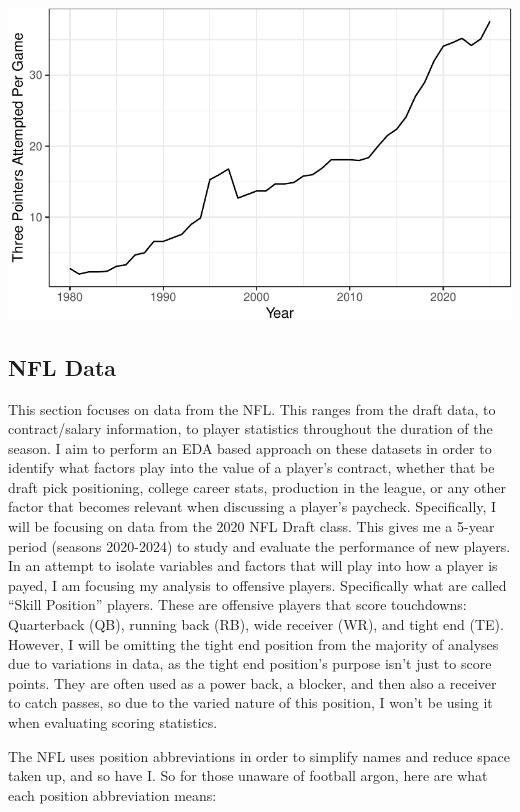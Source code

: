 \documentclass[
  letterpaper,
  DIV=11,
  numbers=noendperiod]{scrartcl}
\begin{document}
\includegraphics{final_qmd_file_files/figure-pdf/unnamed-chunk-1-1.pdf}

\subsection{NFL Data}\label{nfl-data}

This section focuses on data from the NFL. This ranges from the draft
data, to contract/salary information, to player statistics throughout
the duration of the season. I aim to perform an EDA based approach on
these datasets in order to identify what factors play into the value of
a player's contract, whether that be draft pick positioning, college
career stats, production in the league, or any other factor that becomes
relevant when discussing a player's paycheck. Specifically, I will be
focusing on data from the 2020 NFL Draft class. This gives me a 5-year
period (seasons 2020-2024) to study and evaluate the performance of new
players. In an attempt to isolate variables and factors that will play
into how a player is payed, I am focusing my analysis to offensive
players. Specifically what are called ``Skill Position'' players. These
are offensive players that score touchdowns: Quarterback (QB), running
back (RB), wide receiver (WR), and tight end (TE). However, I will be
omitting the tight end position from the majority of analyses due to
variations in data, as the tight end position's purpose isn't just to
score points. They are often used as a power back, a blocker, and then
also a receiver to catch passes, so due to the varied nature of this
position, I won't be using it when evaluating scoring statistics.

The NFL uses position abbreviations in order to simplify names and
reduce space taken up, and so have I. So for those unaware of football
argon, here are what each position abbreviation means:
\end{document}
